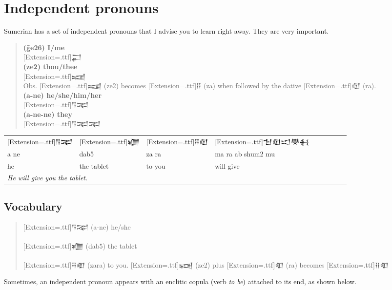 \documentclass[a4paper,12pt]{book}
\newcommand{\fcn}{\setmainfont{Akkadian}[Extension=.ttf]}
\newcommand{\fcm}{\large\setmainfont{Akkadian}[Extension=.ttf]}
\newcommand{\fsm}{\Large\setmainfont{Akkadian}[Extension=.ttf]}
\begin{document}
\section*{Independent pronouns}
Sumerian has a set of independent pronouns
that I advise you to learn right away.
They are very important.
\begin{quotation}
\noindent
{\bf (g̃e26) I/me}\\
{\fcm 𒂷}\\

\noindent
{\bf (ze2) thou/thee}\\
{\fcm 𒍢}\\
Obs. {\Large\fcn 𒍢} (ze2) becomes {\Large \fcn 𒍝} (za)
when followed by the dative {\Large\fcn 𒊏} (ra).\\

\noindent
{\bf (a-ne) he/she/him/her}\\
{\fcm 𒀀𒉈}\\

\noindent
{\bf (a-ne-ne) they}\\
{\Large\fcn 𒀀𒉈𒉈}
\verb||\\
\end{quotation}

\noindent
\begin{tabular}[!h]{l l l l l l l l l}
  \fcm 𒀀𒉈 &\fcm 𒁾
  &\fcm 𒍝𒊏 &\fcm 𒈠𒊏𒀊𒋧𒈬\\
  a ne & dab5 & za ra & ma ra ab shum2 mu\\
  he & the tablet & to you & will give\\
  \multicolumn{4}{l}{\em He will give you the tablet.}\\
\end{tabular}

\subsection*{Vocabulary}
\begin{quotation}
\noindent
{\fsm 𒀀𒉈}  (a-ne) he/she\\
\verb||\\
{\fsm 𒁾}  (dab5) the tablet\\
\verb||\\
{\fsm 𒍝𒊏}  (zara) to you.
{\fcn 𒍢} (ze2) plus {\fcn 𒊏} (ra)
becomes {\fcn 𒍝𒊏}
\end{quotation}

\newpage
Sometimes, an independent pronoun appears
with an enclitic copula (verb {\em to be})
attached to its end, as shown below.\\
\end{document}

